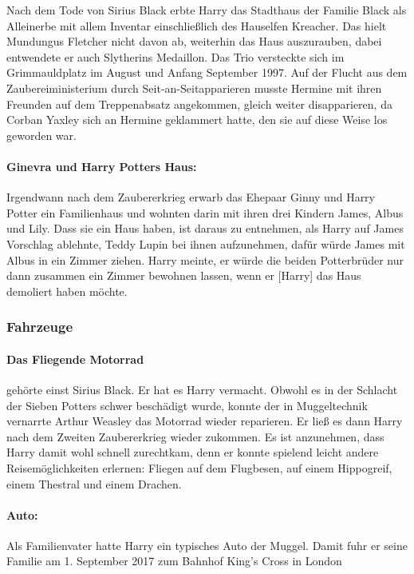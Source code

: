 \documentclass[a4paper, 10pt]{article}
\begin{document}
Nach dem Tode von Sirius Black erbte Harry das Stadthaus der Familie Black als Alleinerbe mit allem Inventar einschließlich des Hauselfen Kreacher. Das hielt Mundungus Fletcher nicht davon ab, weiterhin das Haus auszurauben, dabei entwendete er auch Slytherins Medaillon. Das Trio versteckte sich im Grimmauldplatz im August und Anfang September 1997. Auf der Flucht aus dem Zaubereiministerium durch Seit-an-Seitapparieren musste Hermine mit ihren Freunden auf dem Treppenabsatz angekommen, gleich weiter disapparieren, da Corban Yaxley sich an Hermine geklammert hatte, den sie auf diese Weise los geworden war.

\paragraph{Ginevra und Harry Potters Haus:}
Irgendwann nach dem Zaubererkrieg erwarb das Ehepaar Ginny und Harry Potter ein Familienhaus und wohnten darin mit ihren drei Kindern James, Albus und Lily. Dass sie ein Haus haben, ist daraus zu entnehmen, als Harry auf James Vorschlag ablehnte, Teddy Lupin bei ihnen aufzunehmen, dafür würde James mit Albus in ein Zimmer ziehen. Harry meinte, er würde die beiden Potterbrüder nur dann zusammen ein Zimmer bewohnen lassen, wenn er [Harry] das Haus demoliert haben möchte.
\subsubsection*{\large Fahrzeuge}
\paragraph{Das Fliegende Motorrad}
gehörte einst Sirius Black. Er hat es Harry vermacht. Obwohl es in der Schlacht der Sieben Potters schwer beschädigt wurde, konnte der in Muggeltechnik vernarrte Arthur Weasley das Motorrad wieder reparieren. Er ließ es dann Harry nach dem Zweiten Zaubererkrieg wieder zukommen. Es ist anzunehmen, dass Harry damit wohl schnell zurechtkam, denn er konnte spielend leicht andere Reisemöglichkeiten erlernen: Fliegen auf dem Flugbesen, auf einem Hippogreif, einem Thestral und einem Drachen.
\paragraph{Auto:}
Als Familienvater hatte Harry ein typisches Auto der Muggel. Damit fuhr er seine Familie am 1. September 2017 zum Bahnhof King's Cross in London
\end{document}
